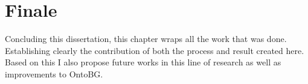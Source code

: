 \chapter{Finale}

Concluding this dissertation, this chapter wraps all the work that was done. Establishing clearly the contribution of both the process and result created here. Based on this I also propose future works in this line of research as well as improvements to OntoBG.







